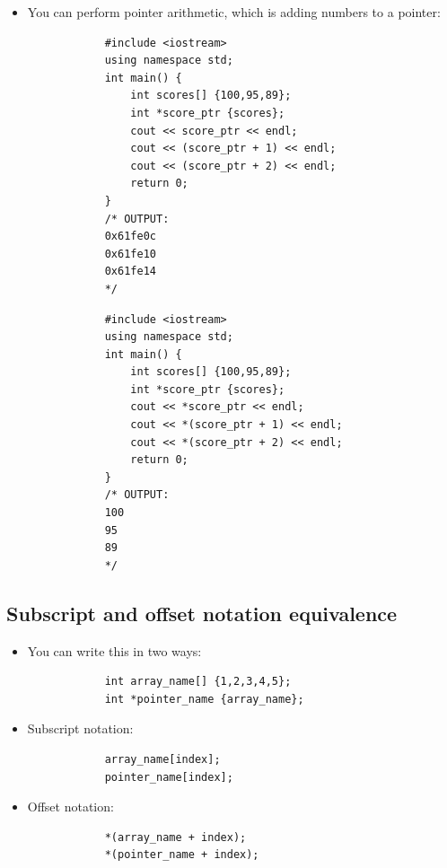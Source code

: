 \begin{itemize}
    \item You can perform pointer arithmetic, which is adding numbers to a pointer:
        \begin{verbatim}
            #include <iostream>
            using namespace std;
            int main() {
                int scores[] {100,95,89};
                int *score_ptr {scores};
                cout << score_ptr << endl;
                cout << (score_ptr + 1) << endl;
                cout << (score_ptr + 2) << endl;
                return 0;
            }
            /* OUTPUT:
            0x61fe0c
            0x61fe10
            0x61fe14
            */
        \end{verbatim}
        \begin{verbatim}
            #include <iostream>
            using namespace std;
            int main() {
                int scores[] {100,95,89};
                int *score_ptr {scores};
                cout << *score_ptr << endl;
                cout << *(score_ptr + 1) << endl;
                cout << *(score_ptr + 2) << endl;
                return 0;
            }
            /* OUTPUT:
            100
            95
            89
            */
        \end{verbatim}
\end{itemize}

\subsection{Subscript and offset notation equivalence}
\begin{itemize}
    \item You can write this in two ways:
        \begin{verbatim}
            int array_name[] {1,2,3,4,5};
            int *pointer_name {array_name};
        \end{verbatim}
    
    \item Subscript notation:
        \begin{verbatim}
            array_name[index];
            pointer_name[index];
        \end{verbatim}
    
    \item Offset notation:
        \begin{verbatim}
            *(array_name + index);
            *(pointer_name + index);
        \end{verbatim}
\end{itemize}


